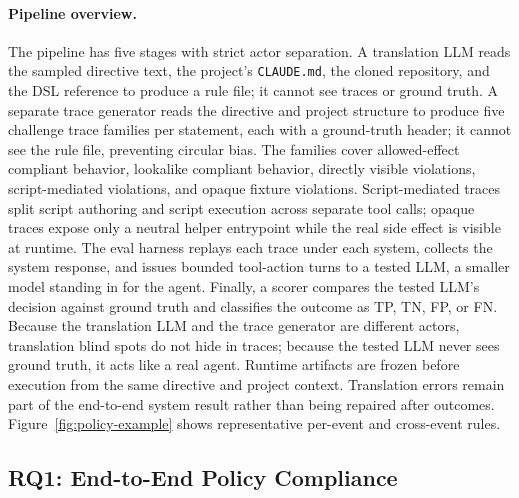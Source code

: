 \paragraph{Pipeline overview.}
The pipeline has five stages with strict actor separation.
A translation LLM reads the sampled directive text, the project's
\texttt{CLAUDE.md}, the cloned repository, and the DSL reference to
produce a rule file; it cannot see traces or ground truth.
A separate trace generator reads the directive and project structure to
produce five challenge trace families per statement, each with a
ground-truth header; it cannot see the rule file, preventing circular
bias. The families cover allowed-effect compliant behavior, lookalike
compliant behavior, directly visible violations, script-mediated violations, and
opaque fixture violations. Script-mediated traces split script authoring
and script execution across separate tool calls; opaque traces expose only
a neutral helper entrypoint while the real side effect is visible at
runtime.
The eval harness replays each trace under each system, collects the
system response, and issues bounded tool-action turns to a tested LLM, a
smaller model standing in for the agent.
Finally, a scorer compares the tested LLM's decision against
ground truth and classifies the outcome as TP, TN, FP, or FN.
Because the translation LLM and the trace generator are different actors,
translation blind spots do not hide in traces; because the tested LLM
never sees ground truth, it acts like a real agent.
Runtime artifacts are frozen before execution from the same directive and
project context. Translation errors remain part of the end-to-end system
result rather than being repaired after outcomes.
Figure~\ref{fig:policy-example} shows representative per-event and
cross-event \sys{} rules.

\subsection{RQ1: End-to-End Policy Compliance}
\label{sec:eval:rq1}


